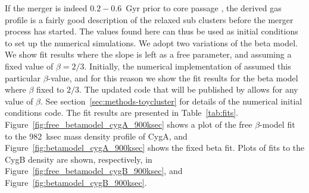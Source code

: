 \documentclass[MScProj_TLRH_ClusterEnergy.tex]{subfiles}
\begin{document}
If the merger is indeed $0.2-0.6$~Gyr prior to core passage \citep{2005AJ....130...47L},
the derived gas profile is a fairly good description of the relaxed sub clusters 
before the merger process has started. The values found here can thus be used
as initial conditions to set up the numerical simulations. We adopt two %
variations of the beta model. We show fit results where the slope is left as a 
free parameter, and assuming a fixed value of $\beta=2/3$. Initially, the 
numerical implementation of  \citep{2014MNRAS.438.1971D} assumed
this particular $\beta$-value, and for this reason we show the fit results for
the beta model where $\beta$ fixed to $2/3$. 
The updated code that will be published by \citet[in prep]{2016MNRAS.000.000D} 
allows for any value of $\beta$. See section~\ref{sec:methods-toycluster} for
details of the numerical initial conditions code. The fit results are presented
in Table~\ref{tab:fits}. Figure~\ref{fig:free_betamodel_cygA_900ksec} shows a 
plot of the free $\beta$-model fit to the 982~ksec mass density profile of CygA, 
and Figure~\ref{fig:betamodel_cygA_900ksec} shows the fixed beta fit. Plots of 
fits to the CygB density are shown, respectively, in 
Figure~\ref{fig:free_betamodel_cygB_900ksec}, and 
Figure~\ref{fig:betamodel_cygB_900ksec}. 
\end{document}
